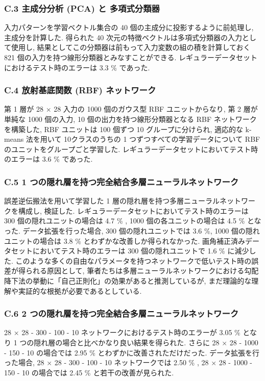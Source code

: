 \documentclass[twocolumn]{jarticle}     %
\begin{document}
\subsubsection*{C.3 主成分分析 (PCA) と 多項式分類器}
入力パターンを学習ベクトル集合の 40 個の主成分に投影するように前処理し, 主成分を計算した. 得られた 40 次元の特徴ベクトルは多項式分類器の入力として使用し, 結果としてこの分類器は前もって入力変数の組の積を計算しておく 821 個の入力を持つ線形分類器とみなすことができる.
レギュラーデータセットにおけるテスト時のエラーは 3.3 \% であった.

\subsubsection*{C.4 放射基底関数 (RBF) ネットワーク}
第 1 層が 28 × 28 入力の 1000 個のガウス型 RBF ユニットからなり, 第 2 層が単純な 1000 個の入力, 10 個の出力を持つ線形分類器となる RBF ネットワークを構築した,
RBF ユニットは 100 個ずつ 10 グループに分けられ, 適応的な k-means 法を用いて 10クラスのうちの 1 つずつすべての学習データについて RBF のユニットをグループごと学習した.
レギュラーデータセットにおいてテスト時のエラーは 3.6 \% であった.

\subsubsection*{C.5 1 つの隠れ層を持つ完全結合多層ニューラルネットワーク}

誤差逆伝搬法を用いて学習した 1 層の隠れ層を持つ多層ニューラルネットワークを構成し, 検証した.
レギュラーデータセットにおいてテスト時のエラーは 300 個の隠れユニットの場合は  4.7 \% , 1000 個の各ユニットの場合は 4.5 \% となった.
データ拡張を行った場合, 300 個の隠れユニットでは 3.6 \%, 1000 個の隠れユニットの場合は 3.8 \% とわずかな改善しか得られなかった.
画角補正済みデータセットにおいてテスト時のエラーは 300 個の隠れユニットで 1.6 \% に減少した.
このような多くの自由なパラメータを持つネットワークで低いテスト時の誤差が得られる原因として, 筆者たちは多層ニューラルネットワークにおける勾配降下法の挙動に「自己正則化」の効果があると推測しているが, まだ理論的な理解や実証的な根拠が必要であるとしている.

\subsubsection*{C.6 2 つの隠れ層を持つ完全結合多層ニューラルネットワーク}
28 × 28 - 300 - 100 - 10 ネットワークにおけるテスト時のエラーが 3.05 \% となり 1 つの隠れ層の場合と比べかなり良い結果を得られた. さらに 28 × 28 - 1000 - 150 - 10 の場合では 2.95 \% とわずかに改善されただけだった. データ拡張を行った場合, 28 × 28 - 300 - 100 - 10 ネットワークでは 2.50 \% , 28 × 28 - 1000 - 150 - 10 の場合では 2.45 \% と若干の改善が見られた.
\end{document}
